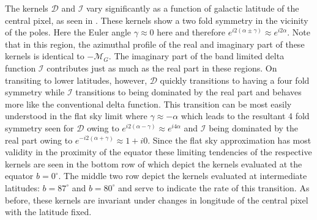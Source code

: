 %

The kernels $\mathcal{D}$ and $\mathcal{I}$ vary significantly as a function of galactic latitude of the central pixel, as seen in . These kernels show a two fold symmetry in the vicinity of the poles.  Here the Euler angle $\gamma \approx 0$ here and therefore $e^{i2(\alpha \pm \gamma)} \approx e^{i2\alpha}$. Note that in this region, the azimuthal profile of the real and imaginary part of these kernels is identical to $-\mathcal{M}_G$.  The imaginary part of the band limited delta function $\mathcal{I}$ contributes just as much as the real part in these regions. On transiting to lower latitudes, however, $\mathcal{D}$ quickly transitions to having a four fold symmetry while $\mathcal{I}$ transitions to being dominated by the real part and behaves more like the conventional delta function. This transition can be most easily understood in the flat sky limit where $\gamma \approx -\alpha$ which leads to the resultant 4 fold symmetry seen for $\mathcal{D}$ owing to $e^{i2(\alpha - \gamma)} \approx e^{i4\alpha}$ and $\mathcal{I}$ being dominated by the real part owing to $e^{-i2(\alpha + \gamma)} \approx 1 + i0$. Since the flat sky approximation has most validity in the proximity of the equator these limiting tendencies of the respective kernels are seen in the bottom row of  which depict the kernels evaluated at the equator $b=0^{\circ}$. The middle two row depict the kernels evaluated at intermediate latitudes: $b=87^{\circ}$ and $b=80^{\circ}$ and serve to indicate the rate of this transition. As before, these kernels are invariant under changes in longitude of the central pixel with the latitude fixed.
